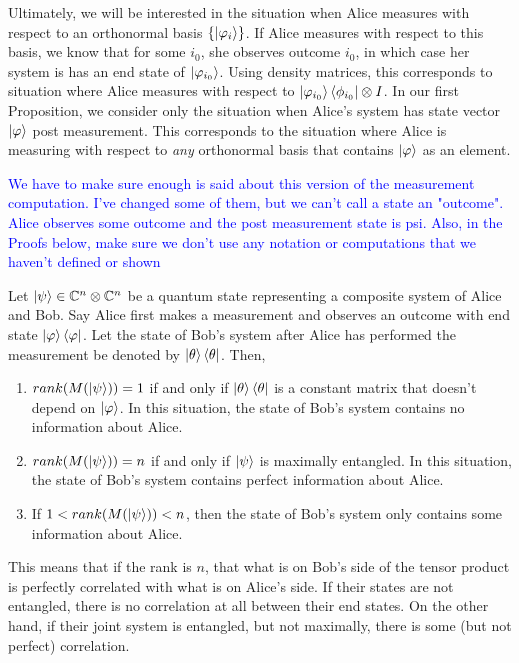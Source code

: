 Ultimately, we will be interested in the situation when Alice measures with respect to an orthonormal basis $\{\ket{\varphi_i}\}$.  If Alice measures with respect to this basis, we know that for some $i_0$, she observes outcome $i_0$, in which case her system is has an end state of $\ket{\varphi_{i_0}}$. Using density matrices, this corresponds to situation where Alice measures with respect to $\ket{\varphi_{i_0}}\bra{\phi_{i_0}} \otimes I$.  In our first Proposition, we consider only the situation when Alice's system has state vector $\ket{\varphi}$ post measurement.  This corresponds to the situation where Alice is measuring with respect to {\emph{any}} orthonormal basis that contains $\ket{\varphi}$ as an element.


\textcolor{blue}{We have to make sure enough is said about this version of the measurement computation.  I've changed some of them, but we can't call a state an "outcome".  Alice observes some outcome and the post measurement state is psi.  Also, in the Proofs below, make sure we don't use any notation or computations that we haven't defined or shown}

\begin{prop}
\label{entanglement-rank}
Let $\ket{\psi} \in \mathbb{C}^n \otimes \mathbb{C}^{n}$ be a quantum state representing a composite system of Alice and Bob. Say Alice first makes a measurement and observes an outcome with end state $\ket{\varphi}\bra{\varphi}$. Let the state of Bob's system after Alice has performed the measurement be denoted by $\ket{\theta}\bra{\theta}$. Then,
\begin{enumerate}
    \item $rank(M(\ket{\psi}))=1$ if and only if $\ket{\theta}\bra{\theta}$ is a constant matrix that doesn't depend on $\ket{\varphi}$. In this situation, the state of Bob's system contains no information about Alice.
    \item $rank(M(\ket{\psi}))=n$ if and only if $\ket{\psi}$ is maximally entangled. In this situation, the state of Bob's system contains perfect information about Alice.
    \item If $1<rank(M(\ket{\psi}))<n$, then the state of Bob's system only contains some information about Alice.
\end{enumerate}
\end{prop}

This means that if the rank is $n$, that what is on Bob's side of the tensor product is perfectly correlated with what is on Alice's side.  If their states are not entangled, there is no correlation at all between their end states.  On the other hand, if their joint system is entangled, but not maximally, there is some (but not perfect) correlation.  

